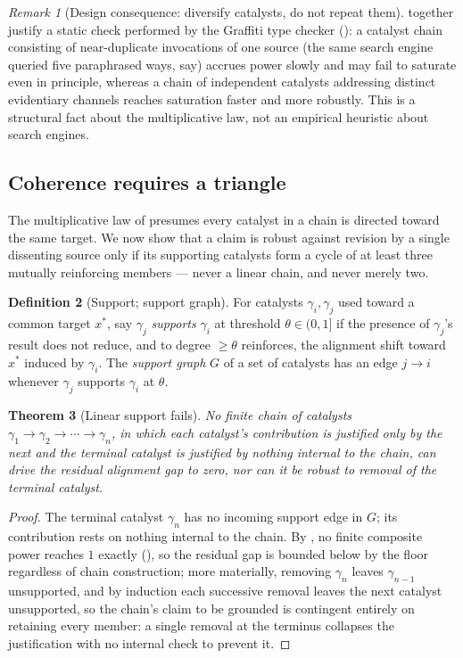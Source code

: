 \documentclass[11pt,twocolumn,a4paper]{article}
\theoremstyle{thmstyle}
\newtheorem{theorem}{Theorem}[section]
\theoremstyle{definition}
\newtheorem{definition}[theorem]{Definition}
\theoremstyle{remark}
\newtheorem{remark}[theorem]{Remark}
\begin{document}
\begin{remark}[Design consequence: diversify catalysts, do not repeat
them]
\label{rem:diversify}
 together justify a static check
performed by the Graffiti type checker (): a catalyst
chain consisting of near-duplicate invocations of one source (the same
search engine queried five paraphrased ways, say) accrues power slowly and
may fail to saturate even in principle, whereas a chain of independent
catalysts addressing distinct evidentiary channels reaches saturation
faster and more robustly. This is a structural fact about the
multiplicative law, not an empirical heuristic about search engines.
\end{remark}

\subsection{Coherence requires a triangle}

The multiplicative law of  presumes every
catalyst in a chain is directed toward the same target. We now show that a
claim is robust against revision by a single dissenting source only if its
supporting catalysts form a cycle of at least three mutually reinforcing
members --- never a linear chain, and never merely two.

\begin{definition}[Support; support graph]
\label{def:support}
For catalysts $\gamma_i,\gamma_j$ used toward a common target $x^{\ast}$,
say $\gamma_j$ \emph{supports} $\gamma_i$ at threshold $\theta\in(0,1]$ if
the presence of $\gamma_j$'s result does not reduce, and to degree
$\ge\theta$ reinforces, the alignment shift toward $x^{\ast}$ induced by
$\gamma_i$. The \emph{support graph} $G$ of a set of catalysts has an
edge $j\to i$ whenever $\gamma_j$ supports $\gamma_i$ at $\theta$.
\end{definition}

\begin{theorem}[Linear support fails]
\label{thm:linear-fails}
No finite chain of catalysts $\gamma_1\to\gamma_2\to\cdots\to\gamma_n$, in
which each catalyst's contribution is justified only by the next and the
terminal catalyst is justified by nothing internal to the chain, can drive
the residual alignment gap to zero, nor can it be robust to removal of the
terminal catalyst.
\end{theorem}

\begin{proof}
The terminal catalyst $\gamma_n$ has no incoming support edge in $G$; its
contribution rests on nothing internal to the chain. By
, no finite composite power reaches $1$ exactly
(), so the residual gap is bounded below by the
floor regardless of chain construction; more materially, removing
$\gamma_n$ leaves $\gamma_{n-1}$ unsupported, and by induction each
successive removal leaves the next catalyst unsupported, so the chain's
claim to be grounded is contingent entirely on retaining every member: a
single removal at the terminus collapses the justification with no
internal check to prevent it.
\end{proof}
\end{document}
